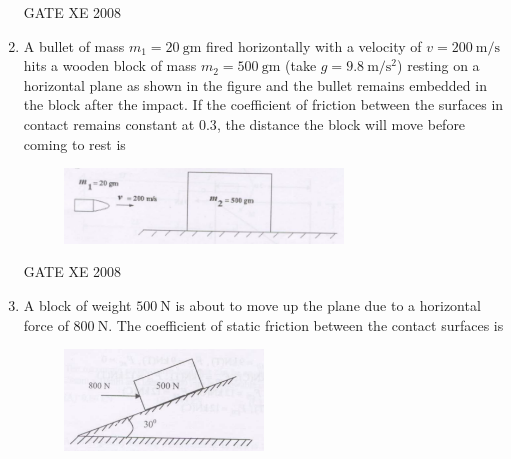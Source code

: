 \documentclass[12pt]{article}
\begin{document}
\begin{enumerate}
\begin{enumerate}
\end{enumerate}
    
    GATE XE 2008  

    \item A bullet of mass $m_{1} = 20\ \mathrm{gm}$ fired horizontally with a velocity of $v = 200\ \mathrm{m/s}$ hits a wooden block of mass $m_{2} = 500\ \mathrm{gm}$ (take $g = 9.8\ \mathrm{m/s^{2}}$) resting on a horizontal plane as shown in the figure and the bullet remains embedded in the block after the impact. If the coefficient of friction between the surfaces in contact remains constant at $0.3$, the distance the block will move before coming to rest is 

    \begin{figure}[H]
    \centering
    \includegraphics[width=0.7\textwidth]{figs/ass1_f_q21.png}
    \caption{}
    \end{figure}

\begin{enumerate}
\end{enumerate}
    
    GATE XE 2008  

    \item A block of weight $500\ \mathrm{N}$ is about to move up the plane due to a horizontal force of $800\ \mathrm{N}$. The coefficient of static friction between the contact surfaces is 

    \begin{figure}[H]
    \centering
    \includegraphics[width=0.5\textwidth]{figs/ass1_f_q22.png}
    \caption{}
    \end{figure}


\end{enumerate}
\end{document}
